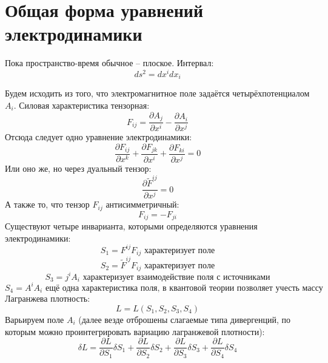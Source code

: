 \section{Общая форма уравнений электродинамики}

Пока пространство-время обычное -- плоское. Интервал:
\[
	ds^2 = dx^i dx_i
\]

Будем исходить из того, что электромагнитное поле задаётся четырёхпотенциалом $A_i$. Силовая характеристика тензорная:
\[
	F_{ij} = \frac{\partial A_j}{\partial x^i} -  \frac{\partial A_i}{\partial x^j}
\]
Отсюда следует одно уравнение электродинамики:
\[
	\frac{\partial F_{ij}}{\partial x^k} + \frac{\partial F_{jk}}{\partial x^i} + \frac{\partial F_{ki}}{\partial x^j} = 0
\]
Или оно же, но через дуальный тензор:
\[
	\frac{\partial \tilde{F}^{ij}}{\partial x^j} = 0 
\]
А также то, что тензор $F_{ij}$ антисимметричный:
\[
	F_{ij} = - F_{ji}
\] 
Существуют четыре инварианта, которыми определяются уравнения электродинамики:
\[
	S_1 = F^{ij}F_{ij} \text{ характеризует поле}
\]
\[
	S_2 = \tilde{F}^{ij}F_{ij} \text{ характеризует поле}
\]
\[
	S_3 = j^i A_i \text{ характеризует взаимодействие поля с источниками}
\]
\[
	S_4 = A^i A_i \text{ ещё одна характеристика поля, в квантовой теории позволяет учесть массу переносчика взаимодействия}
\]
Лагранжева плотность:
\[
	L = L(S_1, S_2, S_3, S_4)
\]
Варьируем поле $A_i$ (далее везде отброшены слагаемые типа дивергенций, по которым можно проинтегрировать вариацию лагранжевой плотности):
\[
	\delta L = 
	\frac{\partial L}{\partial S_1} \delta S_1 + 
	\frac{\partial L}{\partial S_2} \delta S_2 + 
	\frac{\partial L}{\partial S_3} \delta S_3 + 
	\frac{\partial L}{\partial S_4} \delta S_4
\]

